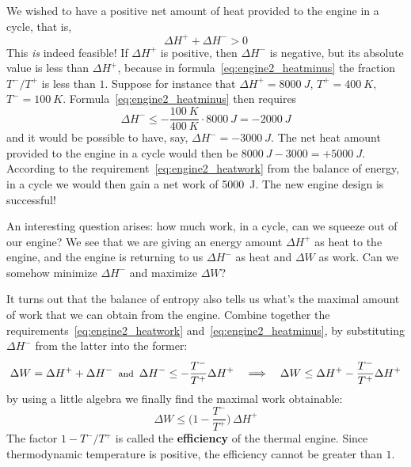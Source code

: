 \documentclass[a4paper,12pt,%
onecolumn,oneside,%
british%
]{memoir}
\newcommand*{\incr}{\Delta}%
\renewcommand*{\|}[1][]{\nonscript\:#1\vert\nonscript\:\mathopen{}}
\newcommand*{\yhep}{\incr H^{+}}%
\newcommand*{\yhem}{\incr H^{-}}%
\newcommand*{\yW}{\incr W}%
\newcommand*{\yT}{T}%
\newcommand*{\yTp}{\yT^{+}}%
\newcommand*{\yTm}{\yT^{-}}%
\begin{document}
We wished to have a positive net amount of heat provided to the engine in a cycle, that is,
\begin{equation*}
  \yhep + \yhem > 0
\end{equation*}
This \emph{is} indeed feasible! If $\yhep$ is positive, then $\yhem$ is negative, but its absolute value is less than $\yhep$, because in formula~\eqref{eq:engine2_heatminus} the fraction $\yTm/\yTp$ is less than $1$. Suppose for instance that $\yhep=\qty{8000}{J}$, $\yTp=\qty{400}{K}$, $\yTm=\qty{100}{K}$. Formula~\eqref{eq:engine2_heatminus} then requires
\begin{equation*}
  \yhem \le -\frac{\qty{100}{K}}{\qty{400}{K}}\cdot\qty{8000}{J} = -\qty{2000}{J}
\end{equation*}
and it would be possible to have, say, $\yhem=-\qty{3000}{J}$. The net heat amount provided to the engine in a cycle would then be $\qty{8000}{J}-\qty{3000} = +\qty{5000}{J}$. According to the requirement~\eqref{eq:engine2_heatwork} from the balance of energy, in a cycle we would then gain a net work of \qty{5000}{J}. The new engine design is successful!

\medskip

An interesting question arises: how much work, in a cycle, can we squeeze out of our engine? We see that we are giving an energy amount $\yhep$ as heat to the engine, and the engine is returning to us $\yhem$ as heat and $\yW$ as work. Can we somehow minimize $\yhem$ and maximize $\yW$?

It turns out that the balance of entropy also tells us what's the maximal amount of work that we can obtain from the engine. Combine together the requirements~\eqref{eq:engine2_heatwork} and~\eqref{eq:engine2_heatminus}, by substituting $\yhem$ from the latter into the former:
\begin{equation*}
  \yW = \yhep + \yhem
  \enspace\text{\footnotesize and}\enspace
  \yhem \le -\frac{\yTm}{\yTp}\yhep
\quad\Longrightarrow\quad
  \yW \le \yhep -\frac{\yTm}{\yTp}\yhep
\end{equation*}
by using a little algebra we finally find the maximal work obtainable:
\begin{equation}\label{eq:thermal_efficiency}
  \yW \le \biggl(1-\frac{\yTm}{\yTp}\biggr)\,\yhep
\end{equation}
The factor $1-\yTm/\yTp$ is called the \textbf{efficiency} of the thermal engine. Since thermodynamic temperature is positive, the efficiency cannot be greater than $1$.
\end{document}
